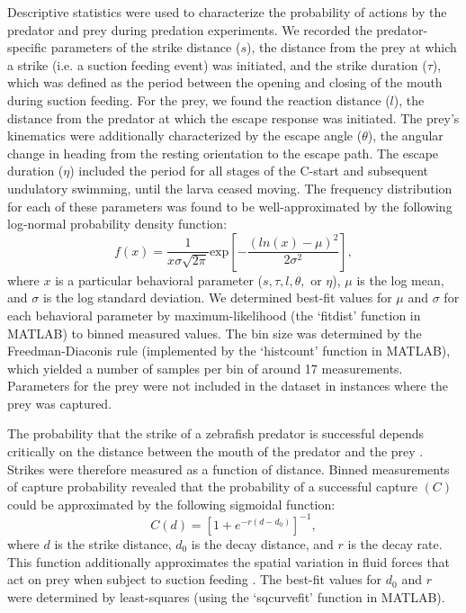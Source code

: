 \documentclass[]{rsos}%
\begin{document}
Descriptive statistics were used to characterize the probability of actions by the predator and prey during predation experiments.
We recorded the predator-specific parameters of the strike distance ($s$), the distance from the prey at which a strike (i.e. a suction feeding event) was initiated, and the strike duration ($\tau$), which was defined as the period between the opening and closing of the mouth during suction feeding. 
For the prey, we found the reaction distance ($l$), the distance from the predator at which the escape response was initiated.
The prey's kinematics were additionally characterized by the escape angle ($\theta$), the angular change in heading from the resting orientation to the escape path.
The escape duration ($\eta$) included the period for all stages of the C-start and subsequent undulatory swimming, until the larva ceased moving.
The frequency distribution for each of these parameters was found to be well-approximated by the following log-normal probability density function:
%
\begin{equation}%
f(x) = \frac{1}{x\sigma \sqrt{2 \pi}} \text{exp} \left[ -{\frac{(ln(x)-\mu)^2}{2\sigma ^2}} \right],
\label{eqn_lognorm}
\end{equation}
%
where $x$ is a particular behavioral parameter ($s, \tau, l, \theta ,$ or $\eta$), $\mu$ is the log mean, and $\sigma$ is the log standard deviation. 
We determined best-fit values for $\mu$ and $\sigma$ for each behavioral parameter by maximum-likelihood (the `fitdist' function in MATLAB) to binned measured values.
The bin size was determined by the Freedman-Diaconis rule (implemented by the `histcount' function in MATLAB), which yielded a number of samples per bin of around 17 measurements.
Parameters for the prey were not included in the dataset in instances where the prey was captured.

The probability that the strike of a zebrafish predator is successful depends critically on the distance between the mouth of the predator and the prey \cite{Stewart:2013bha}.
Strikes were therefore measured as a function of distance.
Binned measurements of capture probability revealed that the probability of a successful capture $(C)$ could be approximated by the following sigmoidal function:
%
\begin{equation}%
C(d) = \left[ 1+e^{-r(d-d_0)} \right]^{-1},
\label{eqn_sig} 
\end{equation}
%
where $d$ is the strike distance, $d_0$ is the decay distance, and $r$ is the decay rate. 
This function additionally approximates the spatial variation in fluid forces that act on prey when subject to suction feeding \cite{Wainwright:2007uq}.
The best-fit values for $d_0$ and $r$ were determined by least-squares (using the `sqcurvefit' function in MATLAB).
\end{document}
